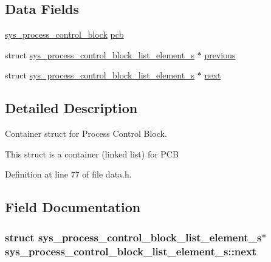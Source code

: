 \subsection*{Data Fields}
\begin{DoxyCompactItemize}
\item 
\hyperlink{data_8h_a4a97a9fe481ab1cef2c0bb4c799431d0}{sys\+\_\+process\+\_\+control\+\_\+block} \hyperlink{structsys__process__control__block__list__element__s_a31a8928210b29e097924862367ae70a7}{pcb}
\item 
struct \hyperlink{structsys__process__control__block__list__element__s}{sys\+\_\+process\+\_\+control\+\_\+block\+\_\+list\+\_\+element\+\_\+s} $\ast$ \hyperlink{structsys__process__control__block__list__element__s_a91a80f7180ef47545efc44c1f94d5fb7}{previous}
\item 
struct \hyperlink{structsys__process__control__block__list__element__s}{sys\+\_\+process\+\_\+control\+\_\+block\+\_\+list\+\_\+element\+\_\+s} $\ast$ \hyperlink{structsys__process__control__block__list__element__s_a1f16ad20706b2be26e3ed97088b6d2f2}{next}
\end{DoxyCompactItemize}


\subsection{Detailed Description}
Container struct for Process Control Block. 

This struct is a container (linked list) for P\+C\+B 

Definition at line 77 of file data.\+h.



\subsection{Field Documentation}
\hypertarget{structsys__process__control__block__list__element__s_a1f16ad20706b2be26e3ed97088b6d2f2}{}
\subsubsection[{next}]{\setlength{\rightskip}{0pt plus 5cm}struct {\bf sys\+\_\+process\+\_\+control\+\_\+block\+\_\+list\+\_\+element\+\_\+s}$\ast$ sys\+\_\+process\+\_\+control\+\_\+block\+\_\+list\+\_\+element\+\_\+s\+::next}\label{structsys__process__control__block__list__element__s_a1f16ad20706b2be26e3ed97088b6d2f2}


